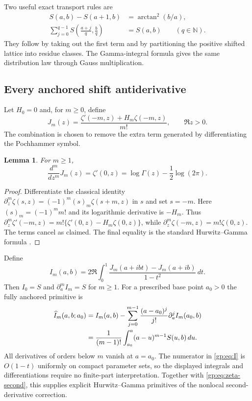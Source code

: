 \documentclass[11pt,a4paper]{article}
\numberwithin{equation}{section}
\newtheorem{lemma}[theorem]{Lemma}
\theoremstyle{definition}
\theoremstyle{remark}
\begin{document}
Two useful exact transport rules are
\begin{align}
 S(a,b)-S(a+1,b)&=\arctan^2(b/a),\label{gp:eq:shift}\\
 \sum_{j=0}^{q-1}S\left(\frac{a+j}{q},\frac bq\right)&=S(a,b)
 \qquad(q\in\mathbb N).\label{gp:eq:distribution}
\end{align}
They follow by taking out the first term and by partitioning the
positive shifted lattice into residue classes.  The Gamma-integral
formula gives the same distribution law through Gauss multiplication.

\subsection{Every anchored shift antiderivative}

Let $H_0=0$ and, for $m\ge0$, define
\begin{equation}\label{gp:eq:J}
 J_m(z)=\frac{\zeta'(-m,z)+H_m\zeta(-m,z)}{m!},\qquad\Re z>0.
\end{equation}
The combination is chosen to remove the extra term generated by
differentiating the Pochhammer symbol.

\begin{lemma}\label{gp:lem:J}
For $m\ge1$,
\[
 \frac{d^m}{dz^m}J_m(z)=\zeta'(0,z)
             =\log\Gamma(z)-\frac12\log(2\pi).
\]
\end{lemma}
\begin{proof}
Differentiate the classical identity
$\partial_z^m\zeta(s,z)=(-1)^m(s)_m\zeta(s+m,z)$ in $s$ and set
$s=-m$.  Here $(s)_m=(-1)^mm!$ and its logarithmic derivative is
$-H_m$.  Thus
$\partial_z^m\zeta'(-m,z)=m!\{\zeta'(0,z)-H_m\zeta(0,z)\}$,
while $\partial_z^m\zeta(-m,z)=m!\zeta(0,z)$.  The terms cancel as
claimed.  The final equality is the standard Hurwitz--Gamma formula
\cite{DLMFZeta}.
\end{proof}

Define
\begin{equation}\label{gp:eq:I}
 I_m(a,b)=2\Re\int_0^1
                 \frac{J_m(a+ibt)-J_m(a+ib)}{1-t^2}\,dt.
\end{equation}
Then $I_0=S$ and $\partial_a^m I_m=S$ for $m\ge1$.
For a prescribed base point $a_0>0$ the fully anchored primitive is
\begin{align}
 \widehat I_m(a,b;a_0)
 &=I_m(a,b)-\sum_{j=0}^{m-1}
       \frac{(a-a_0)^j}{j!}\partial_a^j I_m(a_0,b)
       \label{gp:eq:anchored}\\
 &=\frac1{(m-1)!}\int_{a_0}^{a}(a-u)^{m-1}S(u,b)\,du.
       \notag
\end{align}
All derivatives of orders below $m$ vanish at $a=a_0$.  The numerator
in \eqref{gp:eq:I} is $O(1-t)$ uniformly on compact parameter sets,
so the displayed integrals and differentiations require no finite-part
interpretation.  Together with \eqref{gp:eq:zeta-second}, this supplies
explicit Hurwitz--Gamma primitives of the nonlocal second-derivative
correction.
\end{document}

